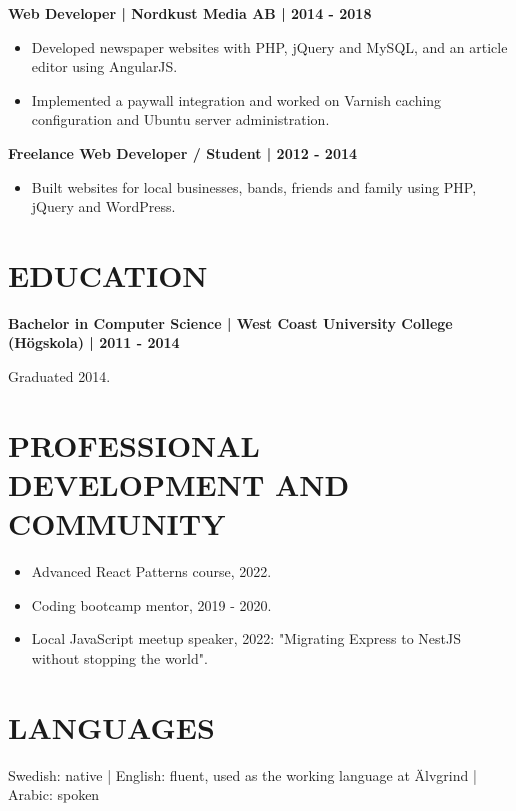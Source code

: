 \documentclass[11pt,a4paper]{article}
\newcommand{\cvsection}[1]{\section*{#1}}
\newcommand{\cvrole}[1]{\par\noindent\textbf{#1}\par}
\begin{document}
\cvrole{Web Developer | Nordkust Media AB | 2014 - 2018}
\begin{itemize}
\item Developed newspaper websites with PHP, jQuery and MySQL, and an article editor using AngularJS.
\item Implemented a paywall integration and worked on Varnish caching configuration and Ubuntu server administration.
\end{itemize}

\cvrole{Freelance Web Developer / Student | 2012 - 2014}
\begin{itemize}
\item Built websites for local businesses, bands, friends and family using PHP, jQuery and WordPress.
\end{itemize}

\cvsection{EDUCATION}
\textbf{Bachelor in Computer Science | West Coast University College (Högskola) | 2011 - 2014}\par
Graduated 2014.

\cvsection{PROFESSIONAL DEVELOPMENT AND COMMUNITY}
\begin{itemize}
\item Advanced React Patterns course, 2022.
\item Coding bootcamp mentor, 2019 - 2020.
\item Local JavaScript meetup speaker, 2022: "Migrating Express to NestJS without stopping the world".
\end{itemize}

\cvsection{LANGUAGES}
Swedish: native | English: fluent, used as the working language at Älvgrind | Arabic: spoken
\end{document}
